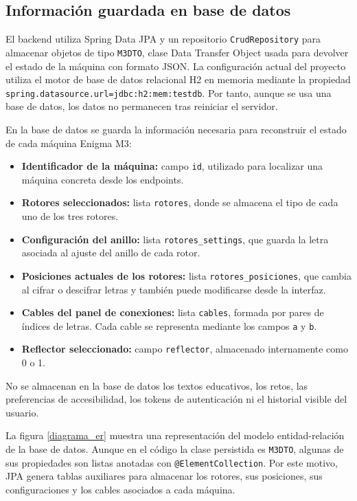 \subsection{Información guardada en base de datos}

El backend utiliza Spring Data JPA y un repositorio \texttt{CrudRepository} para almacenar objetos de tipo \texttt{M3DTO}, clase Data Transfer Object usada para devolver el estado de la máquina con formato JSON. La configuración actual del proyecto utiliza el motor de base de datos relacional H2 en memoria mediante la propiedad  \texttt{spring.datasource.url=jdbc:h2:mem:testdb}. Por tanto, aunque se usa una base de datos, los datos no permanecen tras reiniciar el servidor.

En la base de datos se guarda la información necesaria para reconstruir el estado de cada máquina Enigma M3:

\begin{itemize}
	\item \textbf{Identificador de la máquina:} campo \texttt{id}, utilizado para localizar una máquina concreta desde los endpoints.
	
	\item \textbf{Rotores seleccionados:} lista \texttt{rotores}, donde se almacena el tipo de cada uno de los tres rotores.
	
	\item \textbf{Configuración del anillo:} lista \texttt{rotores\_settings}, que guarda la letra asociada al ajuste del anillo de cada rotor.
	
	\item \textbf{Posiciones actuales de los rotores:} lista \texttt{rotores\_posiciones}, que cambia al cifrar o descifrar letras y también puede modificarse desde la interfaz.
	
	\item \textbf{Cables del panel de conexiones:} lista \texttt{cables}, formada por pares de índices de letras. Cada cable se representa mediante los campos \texttt{a} y \texttt{b}.
	
	\item \textbf{Reflector seleccionado:} campo \texttt{reflector}, almacenado internamente como 0 o 1.
\end{itemize}

No se almacenan en la base de datos los textos educativos, los retos, las preferencias de accesibilidad, los tokens de autenticación ni el historial visible del usuario.

La figura \ref{diagrama_er} muestra una representación del modelo entidad-relación de la base de datos. Aunque en el código la clase persistida es \texttt{M3DTO}, algunas de sus propiedades son listas anotadas con \texttt{@ElementCollection}. Por este motivo, JPA genera tablas auxiliares para almacenar los rotores, sus posiciones, sus configuraciones y los cables asociados a cada máquina.

